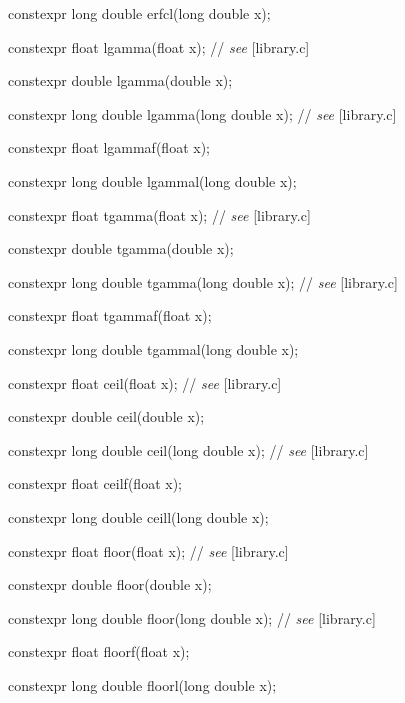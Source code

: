 \documentclass[prd,twocolumn,amsmath,amssymb,nofootinbib,eqsecnum]{revtex4-1}
\newcommand{\highlight}[1]{{\color{green} #1}}
\newcommand{\oldhighlight}[1]{{\color{blue} #1}}
\newcommand{\stdcomment}[1]{{// {\it see} [#1]}}
\begin{document}
{\highlight{constexpr} long double erfcl(long double x);

\vspace{2ex}


\highlight{constexpr} float lgamma(float x); \stdcomment{library.c}

\highlight{constexpr} double lgamma(double x);

\highlight{constexpr} long double lgamma(long double x); \stdcomment{library.c}

\highlight{constexpr} float lgammaf(float x);

\highlight{constexpr} long double lgammal(long double x);

\vspace{2ex}

\highlight{constexpr} float tgamma(float x); \stdcomment{library.c}

\highlight{constexpr} double tgamma(double x);

\highlight{constexpr} long double tgamma(long double x); \stdcomment{library.c}

\highlight{constexpr} float tgammaf(float x);

\highlight{constexpr} long double tgammal(long double x);

\vspace{2ex}

\oldhighlight{constexpr} float ceil(float x); \stdcomment{library.c}

\oldhighlight{constexpr} double ceil(double x);

\oldhighlight{constexpr} long double ceil(long double x); \stdcomment{library.c}

\oldhighlight{constexpr} float ceilf(float x);

\oldhighlight{constexpr} long double ceill(long double x);

\vspace{2ex}


\oldhighlight{constexpr} float floor(float x); \stdcomment{library.c}

\oldhighlight{constexpr} double floor(double x);

\oldhighlight{constexpr} long double floor(long double x); \stdcomment{library.c}

\oldhighlight{constexpr} float floorf(float x);

\oldhighlight{constexpr} long double floorl(long double x);

}
\end{document}
